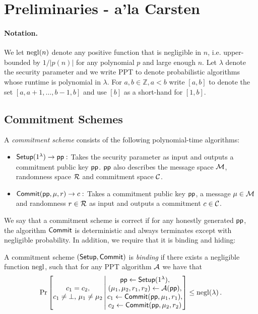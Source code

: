 \section{Preliminaries - a'la Carsten}
\label{sec:prelims}
\paragraph{Notation.}
We let $\mathrm{negl}(n)$ denote any positive function that is negligible in $n$, i.e. upper-bounded by $1/|p(n)|$ for any polynomial $p$ and large enough $n$. Let $\lambda$ denote the security parameter and we write PPT to denote probabilistic algorithms whose runtime is polynomial in $\lambda$. For $a,b\in \mathbb{Z},a<b$ write $[a,b]$ to denote the set $[a,a+1,\dots,b-1,b]$ and use $[b]$ as a short-hand for $[1,b]$.


\subsection{Commitment Schemes}\label{subsec:commit}

\begin{definition}\label{def:commit}
A \emph{commitment scheme} consists of the following polynomial-time algorithms:
\begin{itemize}
    \item $\mathsf{Setup}(1^\lambda)\rightarrow \mathsf{pp}:$ Takes the security parameter as input and outputs a commitment public key $\mathsf{pp}$. $\mathsf{pp}$ also describes the message space $\mathcal{M}$, randomness space $\mathcal{R}$ and commitment space $\mathcal{C}$.
    \item $\mathsf{Commit}(\mathsf{pp},\mu,r) \rightarrow c:$ Takes a commitment public key $\mathsf{pp}$, a message $\mu\in \mathcal{M}$ and randomness $r\in \mathcal{R}$ as input and outputs a commitment $c\in\mathcal{C}$.
\end{itemize}
\end{definition}

We say that a commitment scheme is correct if for any honestly generated $\mathsf{pp}$, the algorithm $\mathsf{Commit}$ is deterministic and always terminates except with negligible probability. In addition, we require that it is binding and hiding:
\begin{definition}[Binding]\label{def:binding}
    A commitment scheme $(\mathsf{Setup},\mathsf{Commit})$ is \emph{binding} if there exists a negligible function $\mathrm{negl}$, such that for any PPT algorithm $\mathcal{A}$ we have that  \[
        \Pr \left[ \begin{matrix} c_1 = c_2, \\ c_1\neq \bot, \, \mu_1\neq \mu_2 \end{matrix} \, \middle | \, \begin{matrix}
            \mathsf{pp} \gets \mathsf{Setup}(1^\lambda), \\
            (\mu_1,\mu_2,r_1,r_2) \gets \mathcal{A}(\mathsf{pp}),\\
            c_1 \gets \mathsf{Commit}(\mathsf{pp}, \mu_1, r_1),\\
            c_2 \gets \mathsf{Commit}(\mathsf{pp}, \mu_2, r_2)
        \end{matrix} \right] \leq \mathrm{negl}(\lambda) \, .    
    \] 
\end{definition}

